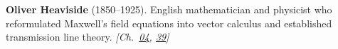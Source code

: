 \textbf{Oliver Heaviside} (1850–1925). English mathematician and physicist who reformulated Maxwell's field equations into vector calculus and established transmission line theory. \emph{[Ch.~\hyperref[ch:energytransmission]{04}, \hyperref[ch:superpermutationsbreakthrough]{39}]}

